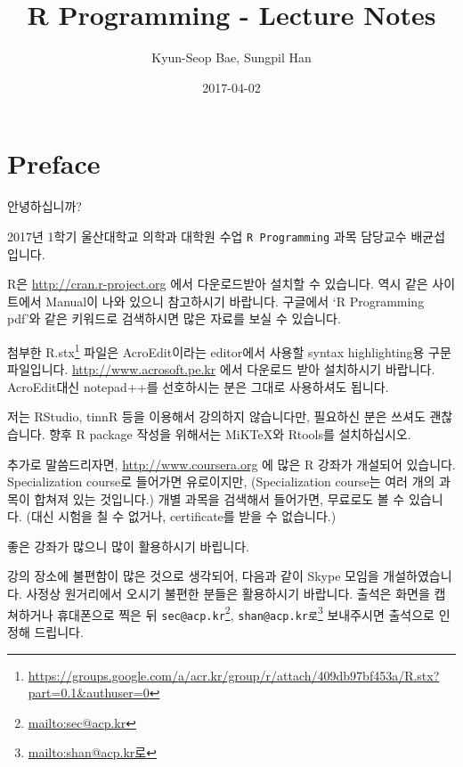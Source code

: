 \documentclass[12pt,]{krantz}
\title{R Programming - Lecture Notes}
\author{Kyun-Seop Bae, Sungpil Han}
\date{2017-04-02}
\renewcommand{\href}[2]{#2\footnote{\url{#1}}}
\theoremstyle{definition}
\theoremstyle{definition}
\theoremstyle{remark}
\begin{document}
\maketitle

\thispagestyle{empty}

\setlength{\abovedisplayskip}{-5pt}
\setlength{\abovedisplayshortskip}{-5pt}

{
\hypersetup{linkcolor=black}
\setcounter{tocdepth}{2}
\tableofcontents
}
\listoftables
\listoffigures
\chapter*{Preface}\label{preface}


안녕하십니까?

2017년 1학기 울산대학교 의학과 대학원 수업 \texttt{R\ Programming} 과목
담당교수 배균섭입니다.

R은 \url{http://cran.r-project.org} 에서 다운로드받아 설치할 수
있습니다. 역시 같은 사이트에서 Manual이 나와 있으니 참고하시기 바랍니다.
구글에서 `R Programming pdf'와 같은 키워드로 검색하시면 많은 자료를 보실
수 있습니다.

첨부한
\href{https://groups.google.com/a/acr.kr/group/r/attach/409db97bf453a/R.stx?part=0.1\&authuser=0}{R.stx}
파일은 AcroEdit이라는 editor에서 사용할 syntax highlighting용 구문
파일입니다. \url{http://www.acrosoft.pe.kr} 에서 다운로드 받아
설치하시기 바랍니다. AcroEdit대신 notepad++를 선호하시는 분은 그대로
사용하셔도 됩니다.

저는 RStudio, tinnR 등을 이용해서 강의하지 않습니다만, 필요하신 분은
쓰셔도 괜찮습니다. 향후 R package 작성을 위해서는 MiKTeX와 Rtools를
설치하십시오.

추가로 말씀드리자면, \url{http://www.coursera.org} 에 많은 R 강좌가
개설되어 있습니다. Specialization course로 들어가면 유로이지만,
(Specialization course는 여러 개의 과목이 합쳐져 있는 것입니다.) 개별
과목을 검색해서 들어가면, 무료로도 볼 수 있습니다. (대신 시험을 칠 수
없거나, certificate를 받을 수 없습니다.)

좋은 강좌가 많으니 많이 활용하시기 바립니다.

강의 장소에 불편함이 많은 것으로 생각되어, 다음과 같이 Skype 모임을
개설하였습니다. 사정상 원거리에서 오시기 불편한 분들은 활용하시기
바랍니다. 출석은 화면을 캡쳐하거나 휴대폰으로 찍은 뒤
\href{mailto:sec@acp.kr}{\nolinkurl{sec@acp.kr}},
\href{mailto:shan@acp.kr로}{\nolinkurl{shan@acp.kr로}} 보내주시면
출석으로 인정해 드립니다.
\end{document}
